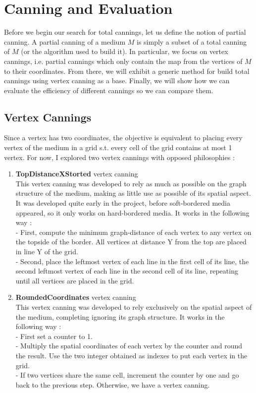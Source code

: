 \documentclass{article}
\begin{document}
\section{Canning and Evaluation}

Before we begin our search for total cannings, let us define the notion of partial canning. A partial canning of a medium $M$ is simply a subset of a total canning of $M$ (or the algorithm used to build it). In particular, we focus on vertex cannings, i.e. partial cannings which only contain the map from the vertices of $M$ to their coordinates. From there, we will exhibit a generic method for build total cannings using vertex canning as a base. Finally, we will show how we can evaluate the efficiency of different cannings so we can compare them.

\subsection{Vertex Cannings}
\label{partial_canning}

Since a vertex has two coordinates, the objective is equivalent to placing every vertex of the medium in a grid s.t. every cell of the grid contains at most 1 vertex. For now, I explored two vertex cannings with opposed philosophies :
\begin{enumerate}
	\item \textbf{TopDistanceXStorted} vertex canning\\
	This vertex canning was developed to rely as much as possible on the graph structure of the medium, making as little use as possible of its spatial aspect. It was developed quite early in the project, before soft-bordered media appeared, so it only works on hard-bordered media. It works in the following way :\\
	- First, compute the minimum graph-distance of each vertex to any vertex on the topside of the border. All vertices at distance Y from the top are placed in line Y of the grid.\\
	- Second, place the leftmost vertex of each line in the first cell of its line, the second leftmost vertex of each line in the second cell of its line, repeating until all vertices are placed in the grid.
	
	\item \textbf{RoundedCoordinates} vertex canning\\
	This vertex canning was developed to rely exclusively on the spatial aspect of the medium, completing ignoring its graph structure. It works in the following way :\\
	- First set a counter to 1.\\
	- Multiply the spatial coordinates of each vertex by the counter and round the result. Use the two integer obtained as indexes to put each vertex in the grid.\\
	- If two vertices share the same cell, increment the counter by one and go back to the previous step. Otherwise, we have a vertex canning.
\end{enumerate}
\end{document}
